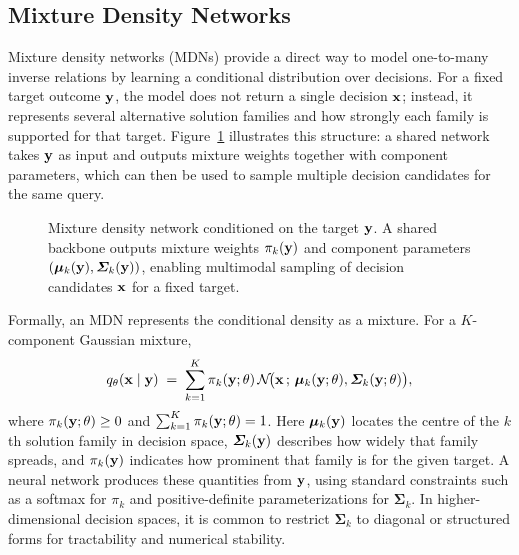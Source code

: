 \subsection{Mixture Density Networks}\label{sec:mdn}

Mixture density networks (MDNs) provide a direct way to model one-to-many inverse relations by learning a conditional distribution over decisions. For a fixed target outcome $\mathbf{y}$, the model does not return a single decision $\mathbf{x}$; instead, it represents several alternative solution families and how strongly each family is supported for that target. Figure~\ref{fig:mdn_architecture} illustrates this structure: a shared network takes $\mathbf{y}$ as input and outputs mixture weights together with component parameters, which can then be used to sample multiple decision candidates for the same query.

\begin{figure}[!htbp]
  \centering
  
  \caption[MDN architecture]{Mixture density network conditioned on the target $\mathbf{y}$. A shared backbone outputs mixture weights $\pi_k(\mathbf{y})$ and component parameters $(\boldsymbol{\mu}_k(\mathbf{y}),\boldsymbol{\Sigma}_k(\mathbf{y}))$, enabling multimodal sampling of decision candidates $\mathbf{x}$ for a fixed target.}
  \label{fig:mdn_architecture}
\end{figure}

Formally, an MDN represents the conditional density as a mixture. For a $K$-component Gaussian mixture,
\begin{equation}
  q_\theta(\mathbf{x}\mid\mathbf{y})
  \;=\;
  \sum_{k=1}^{K}\pi_k(\mathbf{y};\theta)\,
  \mathcal{N}\!\big(\mathbf{x}\,;\,\boldsymbol{\mu}_k(\mathbf{y};\theta),\boldsymbol{\Sigma}_k(\mathbf{y};\theta)\big),
  \label{eq:mdn_conditional}
\end{equation}
where $\pi_k(\mathbf{y};\theta)\ge 0$ and $\sum_{k=1}^{K}\pi_k(\mathbf{y};\theta)=1$.
Here $\boldsymbol{\mu}_k(\mathbf{y})$ locates the centre of the $k$th solution family in decision space, $\boldsymbol{\Sigma}_k(\mathbf{y})$ describes how widely that family spreads, and $\pi_k(\mathbf{y})$ indicates how prominent that family is for the given target. A neural network produces these quantities from $\mathbf{y}$, using standard constraints such as a softmax for $\pi_k$ and positive-definite parameterizations for $\boldsymbol{\Sigma}_k$. In higher-dimensional decision spaces, it is common to restrict $\boldsymbol{\Sigma}_k$ to diagonal or structured forms for tractability and numerical stability.

